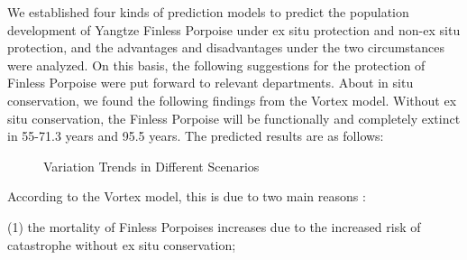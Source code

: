 \documentclass{mcmthesis}
\numberwithin{figure}{section}
\numberwithin{table}{section}
\numberwithin{equation}{section}
\begin{document}
\begin{memo}

  We established four kinds of prediction models to predict the 
  population development of Yangtze Finless Porpoise under ex 
  situ protection and non-ex situ protection, and the advantages 
  and disadvantages under the two circumstances were analyzed. 
  On this basis, the following suggestions for the protection of 
  Finless Porpoise were put forward to relevant departments.
  About in situ conservation, we found the following findings 
  from the Vortex model. Without ex situ conservation, 
  the Finless Porpoise will be functionally and completely 
  extinct in 55-71.3 years and 95.5 years. The predicted 
  results are as follows:
\begin{figure}[htbp]\label{ExtinctionPic}
    \centering
    \caption{Variation Trends in Different Scenarios}
  \end{figure}
  \par
  According to the Vortex model, this is due to two main reasons :
  \par(1) the mortality of Finless Porpoises increases due to the increased risk of catastrophe without ex situ conservation; 

\end{memo}
\end{document}
